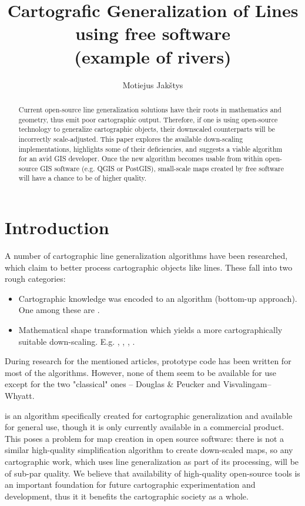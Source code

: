 \documentclass[a4paper]{article}
\title{
    Cartografic Generalization of Lines using free software \\
    (example of rivers) \\ \vspace{4mm}
}
\author{Motiejus Jakštys}
\date{
    \vspace{10mm}
    Version: \VCDescribe \\ \vspace{4mm}
    Generated At: \GeneratedAt

}
\newcommand{\DP}{Douglas \& Peucker}
\newcommand{\VW}{Visvalingam--Whyatt}
\begin{document}
\maketitle

\begin{abstract}
\label{sec:abstract}
Current open-source line generalization solutions have their roots in
    mathematics and geometry, thus emit poor cartographic output. Therefore, if
    one is using open-source technology to generalize cartographic objects,
    their downscaled counterparts will be incorrectly scale-adjusted. This
    paper explores the available down-scaling implementations, highlights some
    of their deficiencies, and suggests a viable algorithm for an avid GIS
    developer. Once the new algorithm becomes usable from within open-source
    GIS software (e.g. QGIS or PostGIS), small-scale maps created by free
    software will have a chance to be of higher quality.
\end{abstract}

\newpage

\tableofcontents
\listoffigures

\newpage

\section{Introduction}
\label{sec:introduction}

A number of cartographic line generalization algorithms have been researched,
which claim to better process cartographic objects like lines. These fall into
two rough categories:
\begin{itemize}
    \item Cartographic knowledge was encoded to an algorithm (bottom-up
        approach). One among these are \cite{wang1998line}.
    \item Mathematical shape transformation which yields a more
        cartographically suitable down-scaling. E.g. \cite{jiang2003line},
        \cite{dyken2009simultaneous}, \cite{mustafa2006dynamic},
        \cite{nollenburg2008morphing}.
\end{itemize}

During research for the mentioned articles, prototype code has been written for
most of the algorithms. However, none of them seem to be available for use
except for the two "classical" ones -- {\DP} and {\VW}.

\cite{wang1998line} is an algorithm specifically created for cartographic
generalization and available for general use, though it is only currently
available in a commercial product. This poses a problem for map creation in
open source software: there is not a similar high-quality simplification
algorithm to create down-scaled maps, so any cartographic work, which uses line
generalization as part of its processing, will be of sub-par quality.
We believe that availability of high-quality open-source tools is an important
foundation for future cartographic experimentation and development, thus it
it benefits the cartographic society as a whole.
\end{document}
